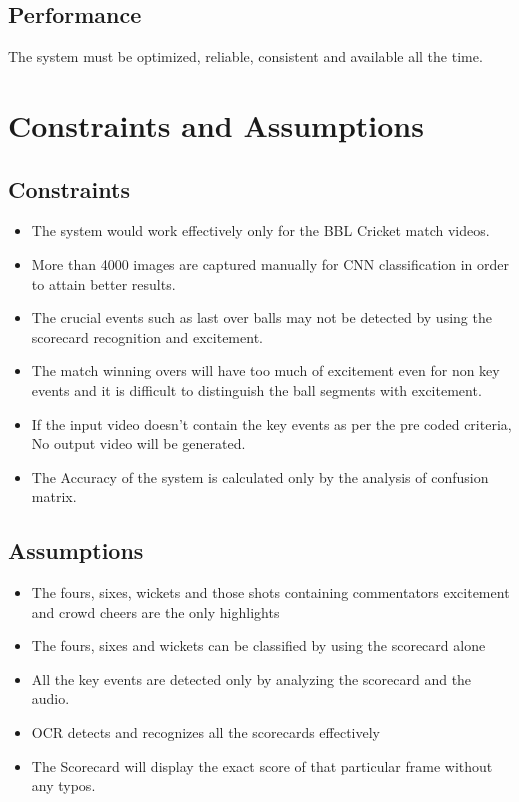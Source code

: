 \subsection{Performance}
The system must be optimized, reliable, consistent and available all
the time.

\section{Constraints and Assumptions}
\subsection{Constraints}
\begin{itemize}
\item The system would work effectively only for the BBL Cricket match videos.
\item More than 4000 images are captured manually for CNN classification in order to attain better results.
\item The crucial events such as last over balls may not be detected by using the scorecard recognition and excitement.
\item The match winning overs will have too much of excitement even for non key events and it is difficult to distinguish the ball segments with excitement.
\item If the input video doesn't contain the key events as per the pre coded criteria, No output video will be generated.
\item The Accuracy of the system is calculated only by the analysis of confusion matrix.
\end{itemize}
\subsection{Assumptions}
\begin{itemize}
    \item The fours, sixes, wickets and those shots containing commentators excitement and crowd cheers are the only highlights
    \item The fours, sixes and wickets can be classified by using the scorecard alone
    \item All the key events are detected only by analyzing the scorecard and the audio.
    \item OCR detects and recognizes all the scorecards effectively
    \item The Scorecard will display the exact score of that particular frame without any typos.
\end{itemize}

